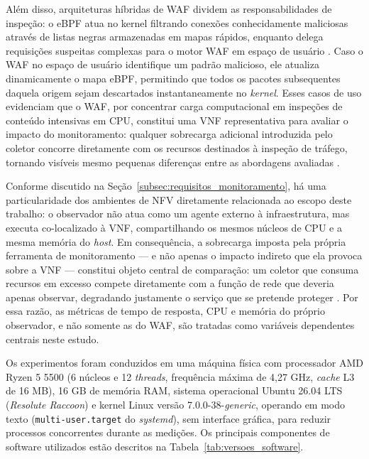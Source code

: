 Além disso, arquiteturas híbridas de WAF dividem as responsabilidades de inspeção: o eBPF atua no kernel filtrando conexões conhecidamente maliciosas através de listas negras armazenadas em mapas rápidos, enquanto delega requisições suspeitas complexas para o motor WAF em espaço de usuário \cite{hybridvnf2017}. Caso o WAF no espaço de usuário identifique um padrão malicioso, ele atualiza dinamicamente o mapa eBPF, permitindo que todos os pacotes subsequentes daquela origem sejam descartados instantaneamente no \textit{kernel}. Esses casos de uso evidenciam que o WAF, por concentrar carga computacional em inspeções de conteúdo intensivas em CPU, constitui uma VNF representativa para avaliar o impacto do monitoramento: qualquer sobrecarga adicional introduzida pelo coletor concorre diretamente com os recursos destinados à inspeção de tráfego, tornando visíveis mesmo pequenas diferenças entre as abordagens avaliadas \cite{10.1145/3397022}.

Conforme discutido na Seção~\ref{subsec:requisitos_monitoramento}, há uma particularidade dos ambientes de NFV diretamente relacionada ao escopo deste trabalho: o observador não atua como um agente externo à infraestrutura, mas executa co-localizado à VNF, compartilhando os mesmos núcleos de CPU e a mesma memória do \textit{host}. Em consequência, a sobrecarga imposta pela própria ferramenta de monitoramento --- e não apenas o impacto indireto que ela provoca sobre a VNF --- constitui objeto central de comparação: um coletor que consuma recursos em excesso compete diretamente com a função de rede que deveria apenas observar, degradando justamente o serviço que se pretende proteger \cite{10.1145/3397022}. Por essa razão, as métricas de tempo de resposta, CPU e memória do próprio observador, e não somente as do WAF, são tratadas como variáveis dependentes centrais neste estudo.

Os experimentos foram conduzidos em uma máquina física com processador AMD Ryzen 5 5500 (6 núcleos e 12 \textit{threads}, frequência máxima de 4,27 GHz, \textit{cache} L3 de 16 MB), 16 GB de memória RAM, sistema operacional Ubuntu 26.04 LTS (\textit{Resolute Raccoon}) e kernel Linux versão 7.0.0-38-\textit{generic}, operando em modo texto (\texttt{multi-user.target} do \textit{systemd}), sem interface gráfica, para reduzir processos concorrentes durante as medições. Os principais componentes de software utilizados estão descritos na Tabela~\ref{tab:versoes_software}.


